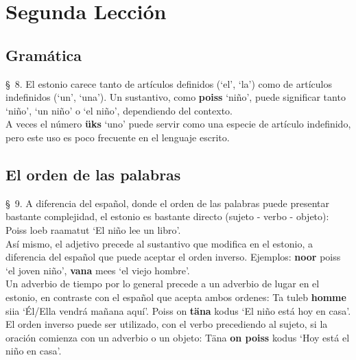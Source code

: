 %
%

\chapter{Segunda Lección} 

\label{ch:lesson02} 


\Large{\section{Gramática}}

\S\ 8. El estonio carece tanto de artículos definidos (`el', `la') como de artículos indefinidos (`un', `una'). Un sustantivo, como \textbf{poiss} `niño', puede significar tanto `niño', `un niño' o `el niño', dependiendo del contexto.\\

A veces el número \textbf{üks} `uno' puede servir como una especie de artículo indefinido, pero este uso es poco frecuente en el lenguaje escrito.\\

\Large{\section{El orden de las palabras}}

\S\ 9. A diferencia del español, donde el orden de las palabras puede presentar bastante complejidad, el estonio es bastante directo (sujeto - verbo - objeto): Poiss loeb raamatut `El niño lee un libro'.\\

Así mismo, el adjetivo precede al sustantivo que modifica en el estonio, a diferencia del español que puede aceptar el orden inverso. Ejemplos: \textbf{noor} poiss `el joven niño', \textbf{vana} mees `el viejo hombre'.\\

Un adverbio de tiempo por lo general precede a un adverbio de lugar en el estonio, en contraste con el español que acepta ambos ordenes: Ta tuleb \textbf{homme} siia `Él/Ella vendrá mañana aquí'. Poiss on \textbf{täna} kodus `El niño está hoy en casa'.\\

El orden inverso puede ser utilizado, con el verbo precediendo al sujeto, si la oración comienza con un adverbio o un objeto: Täna \textbf{on poiss} kodus `Hoy está el niño en casa'.\\

